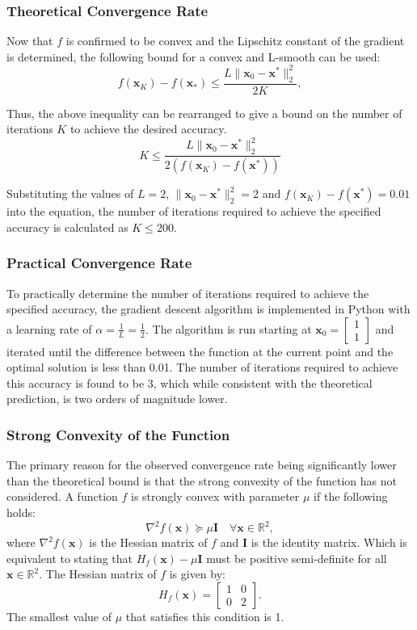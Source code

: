 \documentclass[11pt]{article}
\begin{document}
\subsubsection{Theoretical Convergence Rate}
Now that \(f\) is confirmed to be convex and the Lipschitz constant of the gradient is determined, the following bound for a convex and L-smooth can be used:
$$
    f(\mathbf{x}_K) - f(\mathbf{x}_*) \leq \frac{L \|\mathbf{x}_0 - \mathbf{x}^*\|_2^2}{2K},
$$

Thus, the above inequality can be rearranged to give a bound on the number of iterations $K$ to achieve the desired accuracy. 
\[
K \leq \frac{L \|\mathbf{x}_0 - \mathbf{x}^*\|_2^2}{2(f(\mathbf{x}_K) - f(\mathbf{x}^*))}
\]

Substituting the values of \( L = 2 \), \( \|\mathbf{x}_0 - \mathbf{x}^*\|^2_2 = 2 \) and \(f(\mathbf{x}_K) - f(\mathbf{x}^*) = 0.01 \) into the equation, the number of iterations required to achieve the specified accuracy is calculated as \( K \leq 200 \).

\subsubsection{Practical Convergence Rate}
To practically determine the number of iterations required to achieve the specified accuracy, the gradient descent algorithm is implemented in Python with a learning rate of \( \alpha = \frac{1}{L} = \frac{1}{2} \). The algorithm is run starting at 
\( \mathbf{x}_0 = \begin{bmatrix} 1 \\ 1 \end{bmatrix} \) and iterated until the difference between the function at the current point and the optimal solution is less than 0.01. The number of iterations required to achieve this accuracy is found to be 3, which while consistent with the theoretical prediction, is two orders of magnitude lower.

\subsubsection{Strong Convexity of the Function}
The primary reason for the observed convergence rate being significantly lower than the theoretical bound is that the strong convexity of the function has not considered. A function \( f \) is strongly convex with parameter \( \mu \) if the following holds:
\[
\nabla^2 f(\mathbf{x}) \succeq \mu \mathbf{I} \quad \forall \mathbf{x} \in \mathbb{R}^2,
\]
where \( \nabla^2 f(\mathbf{x}) \) is the Hessian matrix of \( f \) and \( \mathbf{I} \) is the identity matrix. Which is equivalent to stating that \( H_f(\mathbf{x}) - \mu \mathbf{I} \) must be positive semi-definite for all \( \mathbf{x} \in \mathbb{R}^2 \). The Hessian matrix of \( f \) is given by:
\[
H_f(\mathbf{x}) = \begin{bmatrix} 1 & 0 \\ 0 & 2 \end{bmatrix}.
\] The smallest value of \( \mu \) that satisfies this condition is 1.
\end{document}
